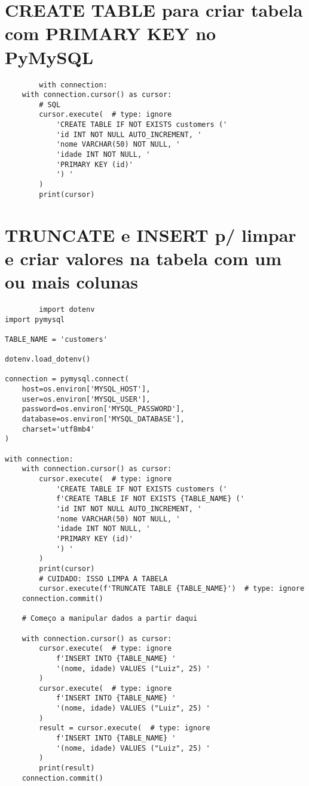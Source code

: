 \documentclass{article}
\begin{document}
    \section{CREATE TABLE para criar tabela com PRIMARY KEY no PyMySQL}
   
    \begin{lstlisting}
        with connection:
    with connection.cursor() as cursor:
        # SQL
        cursor.execute(  # type: ignore
            'CREATE TABLE IF NOT EXISTS customers ('
            'id INT NOT NULL AUTO_INCREMENT, '
            'nome VARCHAR(50) NOT NULL, '
            'idade INT NOT NULL, '
            'PRIMARY KEY (id)'
            ') '
        )
        print(cursor)
    \end{lstlisting}

    \section{TRUNCATE e INSERT p/ limpar e criar valores na tabela com um ou mais colunas}
    \begin{lstlisting}
        import dotenv
import pymysql

TABLE_NAME = 'customers'

dotenv.load_dotenv()

connection = pymysql.connect(
    host=os.environ['MYSQL_HOST'],
    user=os.environ['MYSQL_USER'],
    password=os.environ['MYSQL_PASSWORD'],
    database=os.environ['MYSQL_DATABASE'],
    charset='utf8mb4'
)

with connection:
    with connection.cursor() as cursor:
        cursor.execute(  # type: ignore
            'CREATE TABLE IF NOT EXISTS customers ('
            f'CREATE TABLE IF NOT EXISTS {TABLE_NAME} ('
            'id INT NOT NULL AUTO_INCREMENT, '
            'nome VARCHAR(50) NOT NULL, '
            'idade INT NOT NULL, '
            'PRIMARY KEY (id)'
            ') '
        )
        print(cursor)
        # CUIDADO: ISSO LIMPA A TABELA
        cursor.execute(f'TRUNCATE TABLE {TABLE_NAME}')  # type: ignore
    connection.commit()

    # Começo a manipular dados a partir daqui

    with connection.cursor() as cursor:
        cursor.execute(  # type: ignore
            f'INSERT INTO {TABLE_NAME} '
            '(nome, idade) VALUES ("Luiz", 25) '
        )
        cursor.execute(  # type: ignore
            f'INSERT INTO {TABLE_NAME} '
            '(nome, idade) VALUES ("Luiz", 25) '
        )
        result = cursor.execute(  # type: ignore
            f'INSERT INTO {TABLE_NAME} '
            '(nome, idade) VALUES ("Luiz", 25) '
        )
        print(result)
    connection.commit()
    \end{lstlisting}
\end{document}
